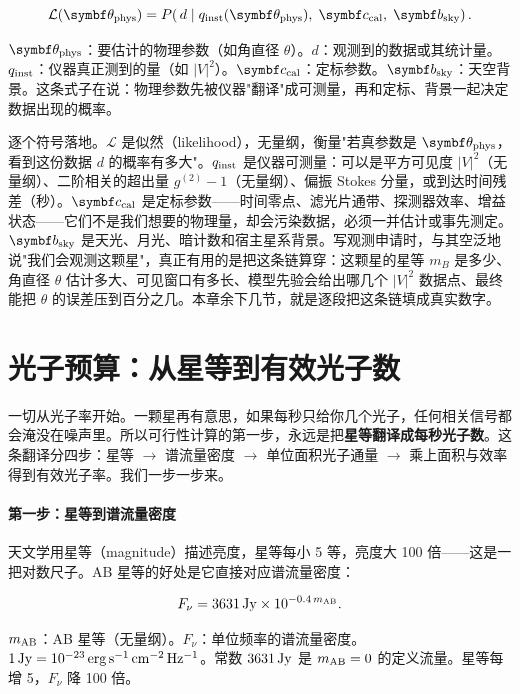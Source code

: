 \begin{equation}
  \mathcal L(\bm\theta_{\rm phys})
  =
  P\!\left(\,d \;\middle|\;
  q_{\rm inst}(\bm\theta_{\rm phys}),\;
  \bm c_{\rm cal},\;
  \bm b_{\rm sky}
  \right).
  \label{eq:e15-likelihood}
\end{equation}
\begin{formulaexplain}
\(\bm\theta_{\rm phys}\)：要估计的物理参数（如角直径 \(\theta\)）。\(d\)：观测到的数据或其统计量。\(q_{\rm inst}\)：仪器真正测到的量（如 \(|V|^2\)）。\(\bm c_{\rm cal}\)：定标参数。\(\bm b_{\rm sky}\)：天空背景。这条式子在说：物理参数先被仪器"翻译"成可测量，再和定标、背景一起决定数据出现的概率。
\end{formulaexplain}

逐个符号落地。\(\mathcal L\) 是似然（likelihood），无量纲，衡量"若真参数是 \(\bm\theta_{\rm phys}\)，看到这份数据 \(d\) 的概率有多大"。\(q_{\rm inst}\) 是仪器可测量：可以是平方可见度 \(|V|^2\)（无量纲）、二阶相关的超出量 \(g^{(2)}-1\)（无量纲）、偏振 Stokes 分量，或到达时间残差（秒）。\(\bm c_{\rm cal}\) 是定标参数——时间零点、滤光片通带、探测器效率、增益状态——它们不是我们想要的物理量，却会污染数据，必须一并估计或事先测定。\(\bm b_{\rm sky}\) 是天光、月光、暗计数和宿主星系背景。写观测申请时，与其空泛地说"我们会观测这颗星"，真正有用的是把这条链算穿：这颗星的星等 \(m_B\) 是多少、角直径 \(\theta\) 估计多大、可见窗口有多长、模型先验会给出哪几个 \(|V|^2\) 数据点、最终能把 \(\theta\) 的误差压到百分之几。本章余下几节，就是逐段把这条链填成真实数字。

\section{光子预算：从星等到有效光子数}
\label{sec:e15-photon-budget}

一切从光子率开始。一颗星再有意思，如果每秒只给你几个光子，任何相关信号都会淹没在噪声里。所以可行性计算的第一步，永远是把\textbf{星等翻译成每秒光子数}。这条翻译分四步：星等 \(\to\) 谱流量密度 \(\to\) 单位面积光子通量 \(\to\) 乘上面积与效率得到有效光子率。我们一步一步来。

\paragraph{第一步：星等到谱流量密度}

天文学用星等（magnitude）描述亮度，星等每小 5 等，亮度大 100 倍——这是一把对数尺子。AB 星等的好处是它直接对应谱流量密度：

\begin{equation}
  F_\nu = 3631\,{\rm Jy}\times 10^{-0.4\,m_{\rm AB}}.
  \label{eq:e15-ab-flux}
\end{equation}
\begin{formulaexplain}
\(m_{\rm AB}\)：AB 星等（无量纲）。\(F_\nu\)：单位频率的谱流量密度。\(1\,{\rm Jy}=10^{-23}\,{\rm erg\,s^{-1}\,cm^{-2}\,Hz^{-1}}\)。常数 \(3631\,{\rm Jy}\) 是 \(m_{\rm AB}=0\) 的定义流量。星等每增 5，\(F_\nu\) 降 100 倍。
\end{formulaexplain}

